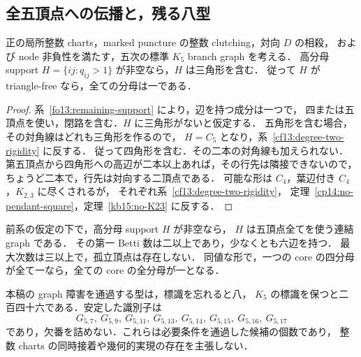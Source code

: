 \subsection{全五頂点への伝播と，残る八型}
\label{sf18:section}

\begin{corollary}[三角形の必要性]
\label{sf18:triangle-required}
正の局所整数 charts，marked puncture の整数 clutching，対向 $D$ の相殺，
および node 非負性を満たす，五次の標準 $K_5$ branch graph を考える．
高分母 support $H=\{ij:q_{ij}>1\}$ が非空なら，$H$ は三角形を含む．
従って $H$ が triangle-free なら，全ての分母は一である．
\end{corollary}

\begin{proof}
系~\ref{fo13:remaining-support} により，辺を持つ成分は一つで，
四または五頂点を使い，閉路を含む．$H$ に三角形がないと仮定する．
五角形を含む場合，その対角線はどれも三角形を作るので，
$H=C_5$ となり，系~\ref{cf13:degree-two-rigidity} に反する．
従って四角形を含む．その二本の対角線も加えられない．
第五頂点から四角形への高辺が二本以上あれば，その行先は隣接できないので，
ちょうど二本で，行先は対向する二頂点である．
可能な形は $C_4$，葉辺付き $C_4$，$K_{2,3}$ に尽くされるが，
それぞれ系~\ref{cf13:degree-two-rigidity}，
定理~\ref{cp14:no-pendant-square}，定理~\ref{kb15:no-K23} に反する．
\end{proof}

\begin{corollary}
\label{sf18:remaining-support}
前系の仮定の下で，高分母 support $H$ が非空なら，
$H$ は五頂点全てを使う連結 graph である．
その第一 Betti 数は二以上であり，少なくとも六辺を持つ．
最大次数は三以上で，孤立頂点は存在しない．
同値な形で，一つの core の四分母が全て一なら，全ての core の全分母が一となる．

本稿の graph 障害を通過する型は，標識を忘れると八，
$K_5$ の標識を保つと二百四十六である．安定した識別子は
\[
 G_{5,7},\ G_{5,9},\ G_{5,11},\ G_{5,13},\
 G_{5,14},\ G_{5,15},\ G_{5,16},\ G_{5,17}
\]
であり，欠番を詰めない．これらは必要条件を通過した候補の個数であり，
整数 charts の同時接着や幾何的実現の存在を主張しない．
\end{corollary}

